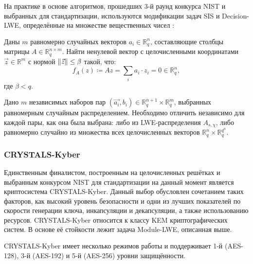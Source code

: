 На практике в основе алгоритмов, прошедших 3-й раунд конкурса NIST и выбранных для стандартизации, используются модификации задач SIS и Decision-LWE, определённые на множестве вещественных чисел \cite{NIST_3-rd}:

\begin{definition}
Даны $m$ равномерно случайных векторов $a_i\in\mathbb{R}_q^n$, составляющие столбцы матрицы $A\in\mathbb{R}_q^{n\times m}$. Найти ненулевой вектор с целочисленными координатами $\vec{z}\in\mathbb{R}^m$ с нормой $\norm{\vec{z}}\leq\beta$ такой, что:
\begin{equation}
    f_A(z)\coloneqq Az=\sum_{i} a_i \cdot z_i=0\in\mathbb{R}_q^n,
\end{equation}
где $\beta < q$.
\end{definition}

\begin{definition}
Дано $m$ независимых наборов пар $(\vec{a_i}, b_i) \in \mathbb{R}_q^{n+1} \times \mathbb{R}_q^m$, выбранных равномерным случайным распределением. Необходимо отличить независимо для каждой пары, как она была выбрана: либо из LWE-распределения $A_{s,\chi}$, либо равномерно случайно из множества всех целочисленных векторов $\mathbb{R}_q^n\times\mathbb{R}_q^{q^n}$.
\end{definition}

\subsubsection{CRYSTALS-Kyber}
Единственным финалистом, построенным на целочисленных решётках и выбранным конкурсом NIST для стандартизации на данный момент является криптосистема CRYSTALS-Kyber. Данный выбор обусловлен сочетанием таких факторов, как высокий уровень безопасности и одни из лучших показателей по скорости генерации ключа, инкапсуляции и декапсуляции, а также использованию ресурсов\cite{NIST_3-rd}. CRYSTALS-Kyber относится к классу KEM криптографических систем. В основе её стойкости лежит задача Module-LWE, описанная выше\cite{Kyber-DOC}.

CRYSTALS-Kyber имеет несколько режимов работы и поддерживает 1-й (AES-128), 3-й (AES-192) и 5-й
(AES-256) уровни защищённости\cite{CRYSTALS-Kyber}.

